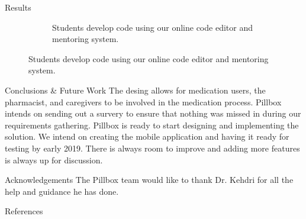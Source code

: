 \documentclass[22pt]{beamer}
\begin{document}
\begin{frame}[fragile]
\begin{textblock}{7.25}
\begin{block}{Results}
\begin{figure}[htbp]
\begin{subfigure}{0.45\textwidth}
   \caption*{Students develop code using our online code editor and mentoring system.}
   \label{fig:TwoAngles}
\end{subfigure}
\end{figure}


\end{block}

\begin{block}{Conclusions \& Future Work}
The desing allows for medication users, the pharmacist, and caregivers to be involved in the medication process. Pillbox intends on sending out a survery to ensure that nothing was missed in during our requirements gathering. Pillbox is ready to start designing and implementing the solution. We intend on creating the mobile application and having it ready for testing by early 2019. There is always room to improve and adding more features is always up for discussion.

\end{block}

\begin{block}{Acknowledgements}
The Pillbox team would like to thank Dr. Kehdri for all the help and guidance he has done.
\end{block}

\begin{block}{References}

{\scriptsize
}
\end{block}


\end{textblock}
\end{frame}
\end{document}
